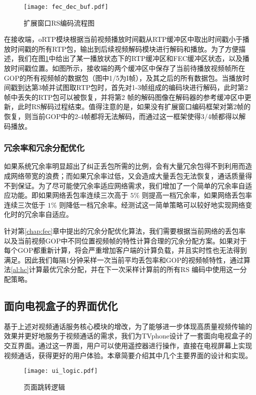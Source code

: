     \begin{figure}[htbp]
      \centering
      \texttt{[image: fec\_dec\_buf.pdf]}
      \caption{扩展窗口RS编码流程图}
      \label{fig:fec_dec_buf}
    \end{figure}

    在接收端，oRTP模块根据当前视频播放时间戳从RTP缓冲区中取出时间戳小于播放时间戳的所有RTP包，输出到后续视频解码模块进行解码和播放。为了方便描述，我们在图\ref{fig:fec_dec_buf}中给出了某一播放状态下的RTP缓冲区和FEC缓冲区状态，以及播放时间戳位置。如图所示，接收端的两个缓冲区中保存了当前待播放视频帧所在GOP的所有视频帧的数据包（图中1/5为I帧），及其之后的所有数据包。当播放时间戳到达第3帧并试图取RTP包时，首先对1-3帧组成的编码块进行解码，此时第2帧中丢失的RTP包可以被恢复，并将第2 帧的解码图像在解码器的参考缓冲区中更新，此时RS解码过程结束。值得注意的是，如果没有扩展窗口编码框架对第2帧的恢复，则当前GOP中的2-4帧都将无法解码，而通过这一框架使得3/4帧都得以解码播放。

    \subsubsection{冗余率和冗余分配优化}
    如果系统冗余率明显超出了纠正丢包所需的比例，会有大量冗余包得不到利用而造成网络带宽的浪费；而如果冗余率过低，又会造成大量丢包无法恢复，通话质量得不到保证。为了尽可能使冗余率适应网络需求，我们增加了一个简单的冗余率自适应功能。即如果网络丢包率连续三次高于 $5\%$ 则提高一档冗余率，如果网络丢包率连续三次低于 $1\%$ 则降低一档冗余率。经测试这一简单策略可以较好地实现网络变化时的冗余率自适应。
    
    针对第\ref{chap:fec}章中提出的冗余分配优化算法，我们需要根据当前网络的丢包率以及当前视频GOP中不同位置视频帧的特性计算合理的冗余分配方案。如果对于每个GOP都重新计算，将会严重增加客户端的计算负载，并且实时性也无法得到满足。因此我们每隔1分钟采样一次当前平均丢包率和GOP的视频帧特性，通过算法\ref{al:hc}计算最优冗余分配，并在下一次采样计算前的所有RS 编码中使用这一分配策略。


\subsection{面向电视盒子的界面优化}
基于上述对视频通话服务核心模块的增改，为了能够进一步体现高质量视频传输的效果并更好地服务于视频通话的需求，我们为TVphone设计了一套面向电视盒子的交互界面。通过这一界面，用户可以使用遥控器进行操作，直接在电视屏幕上实现视频通话，获得更好的用户体验。本章简要介绍其中几个主要界面的设计和实现。

\begin{figure}[htbp]
  \centering
  \texttt{[image: ui\_logic.pdf]}
  \caption{页面跳转逻辑}
  \label{fig:ui_logic}
\end{figure}

